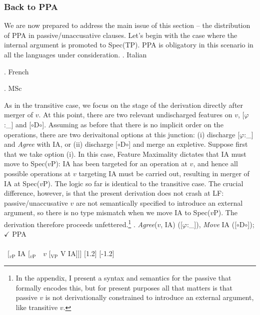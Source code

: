 \documentclass[11pt, letterpaper]{paper_nick}
\newcommand{\fm}[1]{[$\circ$#1$\circ$]}
\begin{document}
\subsubsection{Back to PPA}
We are now prepared to address the main issue of this section -- the distribution of PPA in passive/unaccusative clauses. Let's begin with the case where the internal argument is promoted to Spec(TP). PPA is obligatory in this scenario in all the languages under consideration.
\ex. Italian

\ex. French

\ex. MSc

As in the transitive case, we focus on the stage of the derivation directly after merger of $v$. At this point, there are two relevant undischarged features on $v$, [$\varphi$:\_] and \fm{D}. Assuming as before that there is no implicit order on the operations, there are two derivaitonal options at this junction: (i) discharge [$\varphi$:\_] and \emph{Agree} with IA, or (ii) discharge \fm{D} and merge an expletive. Suppose first that we take option (i). In this case, Feature Maximality dictates that IA must move to Spec($v$P): IA has been targeted for an operation at $v$, and hence all possible operations at $v$ targeting IA must be carried out, resulting in merger of IA at Spec($v$P). The logic so far is identical to the transitive case. The crucial difference, however, is that the present derivation does not crash at LF: passive/unaccusative $v$ are not semantically specified to introduce an external argument, so there is no type mismatch when we move IA to Spec($v$P). The derivation therefore proceeds unfettered.\footnote{In the appendix, I present a syntax and semantics for the passive that formally encodes this, but for present purposes all that matters is that passive $v$ is not derivationally constrained to introduce an external argument, like transitive $v$.} 
\ex. \emph{Agree}($v$, IA) ([$\varphi$:\_]), \emph{Move} IA (\fm{D}); $\checkmark$ PPA\\\\
\ [$_\text{$v$P}$ \hspace*{-.3cm}IA [$_\text{$v$P}$\ \ \hspace*{-.2cm}\hspace*{-.2cm}$v$ [$_\text{VP}$ V \hspace*{-.3cm}IA]]]
[1.2]
[-1.2]\\
\end{document}
